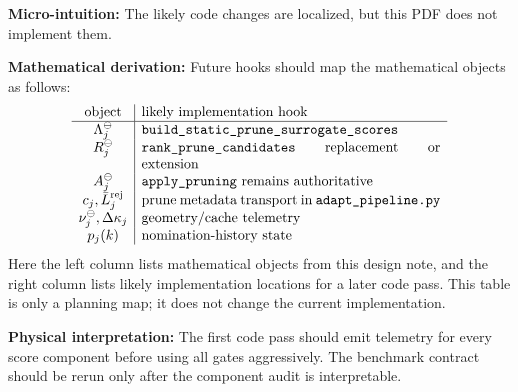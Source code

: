 \documentclass[10pt,twocolumn]{article}
\newcommand{\blk}[1]{\vspace{3pt}\noindent\textbf{#1:}\quad}
\newcommand{\Lam}{\Lambda_j^{\ominus}}
\newcommand{\Rdel}{R_j^{\ominus}}
\begin{document}
\blk{Micro-intuition}
The likely code changes are localized, but this PDF does not implement them.

\blk{Mathematical derivation}
Future hooks should map the mathematical objects as follows:
{\scriptsize
\[
\begin{array}{c|p{0.62\columnwidth}}
\text{object} & \text{likely implementation hook}\\
\hline
\Lam & \texttt{build\_static\_prune\_surrogate\_scores}\\
\Rdel & \texttt{rank\_prune\_candidates} replacement or extension\\
A_j^\ominus & \texttt{apply\_pruning}\text{ remains authoritative}\\
c_j,\bar L_j^{\rm rej} & prune metadata transport in \texttt{adapt\_pipeline.py}\\
\nu_j^\ominus,\Delta\kappa_j & \text{geometry/cache telemetry}\\
p_j(k) & \text{nomination-history state}
\end{array}
\]
}
Here the left column lists mathematical objects from this design note, and the right column lists likely implementation locations for a later code pass. This table is only a planning map; it does not change the current implementation.

\blk{Physical interpretation}
The first code pass should emit telemetry for every score component before using all gates aggressively. The benchmark contract should be rerun only after the component audit is interpretable.
\end{document}
